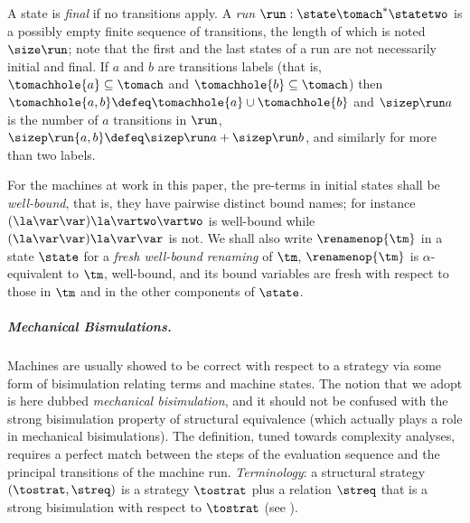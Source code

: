 A state is \emph{final} if no transitions apply.
 A \emph{run} $\run: \state \tomach^*\statetwo$ is a possibly empty finite sequence of transitions, the length of which is noted 
$\size\run$; note that the first and the last states of a run are not necessarily initial and final. 
If $a$ and $b$ are transitions labels (that is, $\tomachhole{a}\subseteq \tomach$ and 
$\tomachhole{b}\subseteq \tomach$) then $\tomachhole{a,b} \defeq \tomachhole{a}\cup \tomachhole{b}$ and $\sizep\run a$ 
is the number of $a$ transitions in $\run$, $\sizep\run {a,b} \defeq \sizep\run a + \sizep\run b $, and similarly for more than two labels. 


For the machines at work in this paper, the pre-terms in initial states shall be \emph{well-bound}, that is, they have pairwise distinct bound names; for instance $(\la\var\var)\la\vartwo\vartwo$ is well-bound while $(\la\var\var)\la\var\var$ is not. 
We shall also write $\renamenop{\tm}$ in a state $\state$ for a \emph{fresh well-bound renaming} of $\tm$,
\ie $\renamenop{\tm}$ is $\alpha$-equivalent to $\tm$, well-bound, and its bound variables
are fresh with respect to those in $\tm$ and in the other components of $\state$.

\subparagraph{Mechanical Bismulations.} Machines are usually showed to be correct with respect to a strategy via some form of bisimulation relating terms and machine states. The notion that we adopt is here dubbed \emph{mechanical bisimulation}, and it should not be confused with the strong bisimulation property of structural equivalence (which actually plays a role in mechanical bisimulations). The definition, tuned towards complexity analyses, requires a perfect match between the steps of the evaluation sequence and the  principal transitions of the machine run. \emph{Terminology}: a structural strategy $(\tostrat,\streq)$ is a strategy $\tostrat$ plus a relation $\streq$ that is a strong bisimulation with respect to $\tostrat$ (see ).

